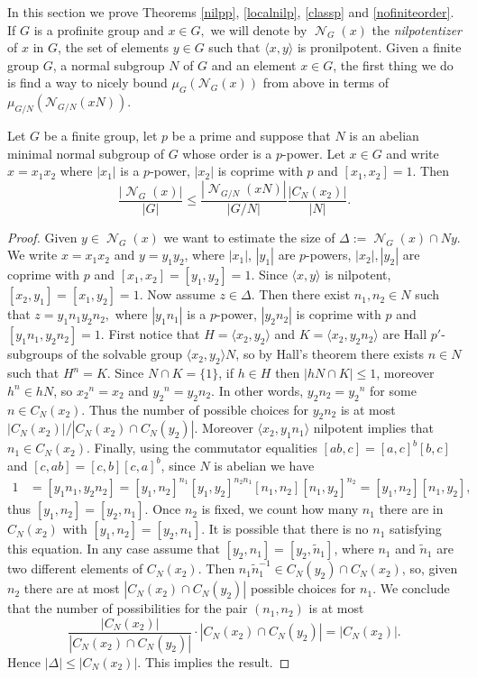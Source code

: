\documentclass{amsart}
\DeclareMathOperator{\nil}{\mathcal N}
\numberwithin{equation}{section}
\begin{document}
In this section we prove Theorems \ref{nilpp}, \ref{localnilp}, \ref{classp} and \ref{nofiniteorder}. If $G$ is a profinite group and $x\in G,$ we will denote by $\nil_G(x)$ the \emph{nilpotentizer} of $x$ in $G$, the set of elements $y \in G$ such that $\langle x,y \rangle$ is pronilpotent. Given a finite group $G$, a normal subgroup $N$ of $G$ and an element $x \in G$, the first thing we do is find a way to nicely bound $\mu_G(\mathcal N_G(x))$ from above in terms of $\mu_{G/N}(\mathcal N_{G/N}(xN))$.

\begin{lemma}\label{nilabcf}
	Let $G$ be a finite group, let $p$ be a prime and suppose that $N$ is an abelian minimal normal subgroup of $G$ whose order is a $p$-power. Let $x\in G$ and write
	$x=x_1x_2$ where $|x_1|$ is a $p$-power, $|x_2|$ is coprime with $p$ and $[x_1,x_2]=1.$
	Then
	$$\frac{|\nil_G(x)|}{|G|}\leq \frac{|\nil_{G/N}(xN)|}{|G/N|}\frac {|C_N(x_2)|}{|N|}.$$
\end{lemma}

\begin{proof}
   Given $y\in \nil_G(x)$ we want to estimate the size of $\Delta:=\nil_G(x)\cap Ny.$ We write $x=x_1x_2$ and $y=y_1y_2$, where $|x_1|$, $|y_1|$ are $p$-powers, $|x_2|, |y_2|$ are coprime with $p$ and $[x_1,x_2]=[y_1,y_2]=1.$ Since $\langle x,y
	\rangle$ is nilpotent, $[x_2,y_1]=[x_1,y_2]=1.$  Now assume $z\in \Delta.$ Then there exist $n_1, n_2\in N$ such that $z=y_1n_1y_2n_2,$ where $|y_1n_1|$ is a $p$-power, $|y_2n_2|$ is coprime with $p$ and $[y_1n_1,y_2n_2]=1.$
	First notice that $H = \langle x_2,y_2 \rangle$ and $K = \langle x_2, y_2n_2\rangle$ are Hall $p'$-subgroups of the solvable group $\langle x_2,y_2 \rangle N$, so by Hall's theorem there exists $n \in N$ such that $H^n = K$. Since $N \cap K = \{1\}$, if $h \in H$ then $|hN \cap K| \leq 1$, moreover $h^n \in hN$, so ${x_2}^n = x_2$ and ${y_2}^n = y_2n_2$. In other words, $y_2n_2 = {y_2}^{n}$ for some
	$n\in C_N(x_2).$ Thus the number of possible choices for
	$y_2n_2$ is at most $|C_N(x_2)|/|C_N(x_2)\cap C_N(y_2)|.$ Moreover
	$\langle x_2, y_1n_1\rangle$ nilpotent implies that $n_1\in C_N(x_2).$ Finally, using the commutator equalities $[ab,c]=[a,c]^b [b,c]$ and $[c,ab]=[c,b][c,a]^b$, since $N$ is abelian we have 
    \begin{align*}
        1 & = [y_1n_1,y_2n_2] = [y_1,n_2]^{n_1} [y_1,y_2]^{n_2n_1} [n_1,n_2] [n_1,y_2]^{n_2} = [y_1,n_2][n_1,y_2],
    \end{align*}
    thus $[y_1,n_2]=[y_2,n_1].$ Once $n_2$ is fixed, we count how many $n_1$ there are in $C_N(x_2)$ with $[y_1,n_2]=[y_2,n_1].$ It is possible that there is no $n_1$ satisfying this equation. In any case assume that 
	$[y_2,n_1]=[y_2,\tilde n_1]$, where $n_1$ and $\tilde n_1$ are two different elements of $C_N(x_2).$ Then $n_1\tilde n_1^{-1}\in C_N(y_2)\cap C_N(x_2)$, so, given $n_2$ there are at most $|C_N(x_2)\cap C_N(y_2)|$ possible choices for $n_1$. We conclude
	that the number of possibilities for the pair $(n_1,n_2)$
	is at most
	$$\frac{|C_N(x_2)|}{|C_N(x_2)\cap C_N(y_2)|}\cdot |C_N(x_2)\cap C_N(y_2)|=|C_N(x_2)|.
	$$
	Hence $|\Delta|\leq |C_N(x_2)|$. This implies the result.
\end{proof}
\end{document}
